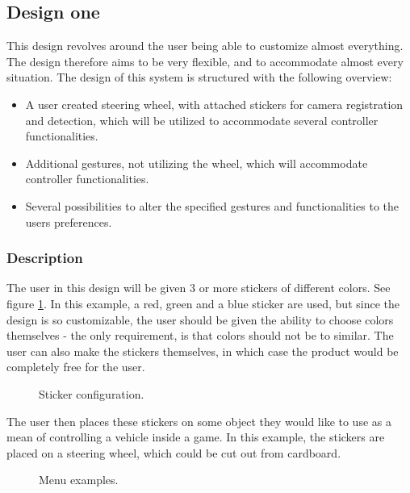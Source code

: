 \subsection{Design one}
\label{design1}
This design revolves around the user being able to customize almost everything. The design therefore aims to be very flexible, and to accommodate almost every situation. The design of this system is structured with the following overview:

\begin{itemize}
\item A user created steering wheel, with attached stickers for camera registration and detection, which will be utilized to accommodate several controller functionalities.
\item Additional gestures, not utilizing the wheel, which will accommodate controller functionalities.
\item Several possibilities to alter the specified gestures and functionalities to the users preferences. 
\end{itemize}


\subsubsection*{Description}
The user in this design will be given 3 or more stickers of different colors. See figure \ref{fig:wheel}. In this example, a red, green and a blue sticker are used, but since the design is so customizable, the user should be given the ability to choose colors themselves - the only requirement, is that colors should not be to similar. The user can also make the stickers themselves, in which case the product would be completely free for the user.


\begin{figure}[!htbp]
\centering
{}
\caption{Sticker configuration.}\label{fig:wheel}
\end{figure}

The user then places these stickers on some object they would like to use as a mean of controlling a vehicle inside a game. In this example, the stickers are placed on a steering wheel, which could be cut out from cardboard.

\begin{figure}[!htbp]
\centering
{}
\caption{Menu examples.}\label{fig:select}
\end{figure}

